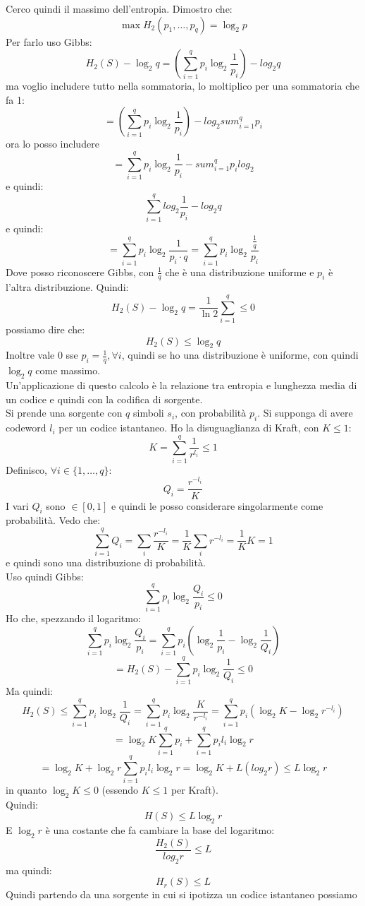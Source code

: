 \documentclass[a4paper,12pt, oneside]{book}
\begin{document}
Cerco quindi il massimo dell'entropia. Dimostro che:
\[\max H_2(p_1,\ldots, p_q)=\log_2 p\]
Per farlo uso Gibbs:
\[H_2(S)-\log_2 q=\left(\sum_{i=1}^q p_i\log_2\frac{1}{p_i}\right)-log_2 q\]
ma voglio includere tutto nella sommatoria, lo moltiplico per una sommatoria che
fa 1:
\[=\left(\sum_{i=1}^q p_i\log_2\frac{1}{p_i}\right)-log_2 sum_{i=1}^qp_i\]
ora lo posso includere
\[=\sum_{i=1}^q p_i\log_2\frac{1}{p_i}- sum_{i=1}^qp_i log_2\]
e quindi:
\[\sum_{i=1}^qlog_2\frac{1}{p_i}-log_2 q\]
e quindi:
\[=\sum_{i=1}^q p_i\log_2\frac{1}{p_i\cdot q}=\sum_{i=1}^q
  p_i\log_2\frac{\frac{1}{q}}{p_i}\]
Dove posso riconoscere Gibbs, con $\frac{1}{q}$ che è una distribuzione
uniforme e $p_i$ è l'altra distribuzione. Quindi:
\[H_2(S)-\log_2 q=\frac{1}{\ln 2}\sum_{i=1}^q\leq 0\]
possiamo dire che:
\[H_2(S)\leq \log_2 q\]
Inoltre vale 0 sse $p_i=\frac{1}{q},\forall i$, quindi se ho una distribuzione è
uniforme, con quindi $\log_2 q$ come massimo.\\
Un'applicazione di questo calcolo è la relazione tra entropia e lunghezza media
di un codice e quindi con la codifica di sorgente.\\
Si prende una sorgente con $q$ simboli $s_i$, con probabilità $p_i$. Si supponga
di avere codeword $l_i$ per un codice istantaneo. Ho la disuguaglianza di Kraft,
con $K\leq 1$:
\[K=\sum_{i=1}^q\frac{1}{r^{l_i}}\leq 1\]
Definisco, $\forall i\in\{1,\ldots, q\}$:
\[Q_i=\frac{r^{-l_i}}{K}\]
I vari $Q_i$ sono $\in[0,1]$ e quindi le posso considerare singolarmente come
probabilità. Vedo che:
\[\sum_{i=1}^q Q_i=\sum_i \frac{r^{-l_i}}{K} = \frac{1}{K}\sum_i
  r^{-l_i}=\frac{1}{K}K =1\]
e quindi sono una distribuzione di probabilità.\\
Uso quindi Gibbs:
\[\sum_{i=1}^q p_i\log_2\frac{Q_i}{p_i}\leq 0\]
Ho che, spezzando il logaritmo:
\[\sum_{i=1}^q p_i\log_2\frac{Q_i}{p_i}=\sum_{i=1}^qp_i\left(
  \log_2\frac{1}{p_i}-\log_2\frac{1}{Q_i}\right)\]
\[=H_2(S)-\sum_{i=1}^qp_i\log_2\frac{1}{Q_i}\leq 0\]
Ma quindi:
\[H_2(S)\leq  \sum_{i=1}^qp_i\log_2\frac{1}{Q_i}=\sum_{i=1}^qp_i\log_2
  \frac{K}{r^{-l_i}}=\sum_{i=1}^qp_i\left(\log_2K - \log_2 r^{-l_i}\right)\]
\[=\log_2 K\sum_{i=1}^qp_i+\sum_{i=1}^qp_i l_i\log_2 r\]
\[
  =\log_2 K+\log_2 r\sum_{i=1}^qp_i l_i\log_2 r=\log_2 K+L(log_2 r)\leq L\log_2
  r\]
in quanto $\log_2 K\leq 0$ (essendo $K\leq 1$ per Kraft).\\
Quindi:
\[H(S)\leq L\log_2 r\]
E $\log_2 r$ è una costante che fa cambiare la base del logaritmo:
\[\frac{H_2(S)}{log_2 r}\leq L\]
ma quindi:
\[H_r(S)\leq L\]
Quindi partendo da una sorgente in cui si ipotizza un codice istantaneo possiamo
\end{document}
